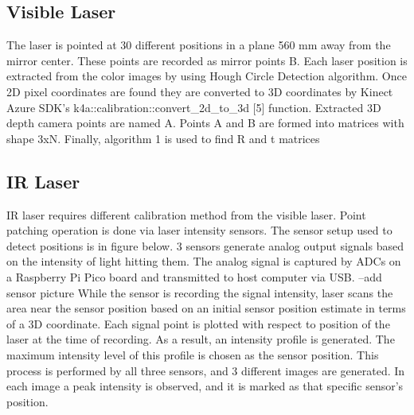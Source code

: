 \subsection{Visible Laser}
\label{sec:Visible Laser}

The laser is pointed at 30 different positions in a plane 
560 mm away from the mirror center. These points are recorded 
as mirror points B. Each laser position is extracted from the 
color images by using Hough Circle Detection algorithm. Once 
2D pixel coordinates are found they are converted to 3D 
coordinates by Kinect Azure SDK's k4a::calibration::convert\_2d\_to\_3d [5] 
function. Extracted 3D depth camera points are named A. 
Points A and B are formed into matrices with shape 3xN. 
Finally, algorithm 1 is used to find R and t matrices


\subsection{IR Laser}
\label{sec:IR Laser}

IR laser requires different calibration method from the 
visible laser. Point patching operation is done via 
laser intensity sensors. The sensor setup used to detect 
positions is in figure below. 3 sensors generate analog 
output signals based on the intensity of light hitting 
them. The analog signal is captured by ADCs on a Raspberry 
Pi Pico board and transmitted to host computer via USB.
--add sensor picture
While the sensor is recording the signal intensity, 
laser scans the area near the sensor position based on an 
initial sensor position estimate in terms of a 3D coordinate. 
Each signal point is plotted with respect to position of the 
laser at the time of recording. As a result, an intensity 
profile is generated. The maximum intensity level of this 
profile is chosen as the sensor position. This process is 
performed by all three sensors, and 3 different images 
are generated. In each image a peak intensity is observed, 
and it is marked as that specific sensor's position.



